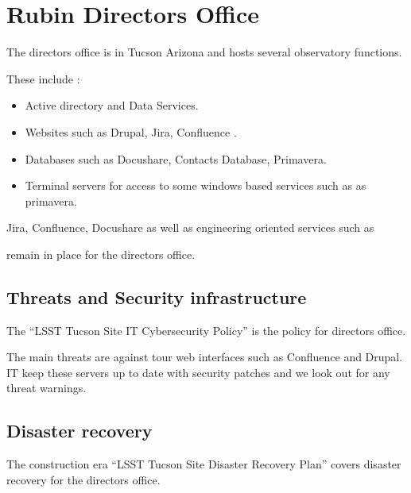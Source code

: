\section{Rubin Directors Office} \label{sec:rdo}

The directors office is in Tucson Arizona and hosts several observatory functions.

These include :

\begin{itemize}
\item Active directory and Data Services.
\item Websites such as Drupal, Jira, Confluence .
\item Databases such as Docushare, Contacts Database, Primavera.
\item Terminal servers for access to some windows based services such as as primavera.
\end{itemize}
Jira, Confluence, Docushare  as well as  engineering oriented services such as


remain in place for the directors office.


\subsection{Threats and Security infrastructure}
The ``LSST Tucson Site IT Cybersecurity Policy''  is the policy for directors office.

The main threats are against tour web interfaces such as Confluence and Drupal.
IT keep these servers up to date with security patches and we look out for any threat warnings.


\subsection {Disaster recovery}
The construction era  ``LSST Tucson Site Disaster Recovery Plan''  covers disaster recovery for the directors office.
